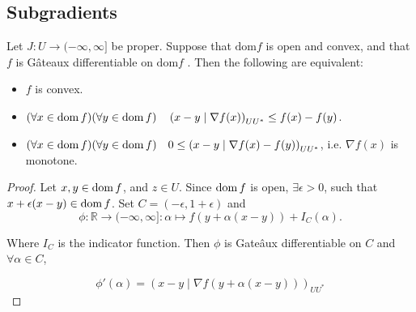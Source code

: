 \subsection{Subgradients}
\begin{proposition}
	 Let $J: U \rightarrow (-\infty, \infty]$ be proper. Suppose that $\text{dom} f$
	 is open and convex, and that $f$ is G\^ateaux differentiable on $\text{dom} f$ . Then the
	 following are equivalent:
	 \begin{itemize}
		 \item $f$ is convex.
		 \item $(\forall x \in \mathrm{dom\,} f )(\forall y \in \mathrm{dom\,} f )\quad \left(x-y\mid \nabla f(x)\right)_{UU^*}\leq f(x)-f(y)$.
		 \item $(\forall x \in \mathrm{dom\,} f )(\forall y \in \mathrm{dom\,} f )\quad 0 \leq \left(x-y\mid \nabla f(x)-f(y)\right)_{UU^*}$, i.e. $
		 \nabla f(x)$ is monotone.
	 \end{itemize}
	 \begin{proof}
		 Let $x,y \in \mathrm{dom\,} f$, and $z \in U$. Since $\mathrm{dom\,} f$ is open, $\exists \epsilon >0$, such that $x+\epsilon(x-y) \in \mathrm{dom\,} f$. Set $C=(-\epsilon, 1+\epsilon) $ and 
		 \[
			 \phi: \mathbb{R}\rightarrow (-\infty, \infty]: \alpha \mapsto f(y+\alpha(x-y))+I_C(\alpha).
		 \]
		 
		 Where $I_C$ is the indicator function.  Then $\phi$ is Gate\^aux differentiable on $C$ and $\forall \alpha \in C$,
		 
		 \[
			 \phi'(\alpha)=\left(x-y\mid\nabla f(y+\alpha (x-y))\right)_{UU^*}
		 \]
	 \end{proof}
\label{prop5. First derivative convex.}
\end{proposition}

